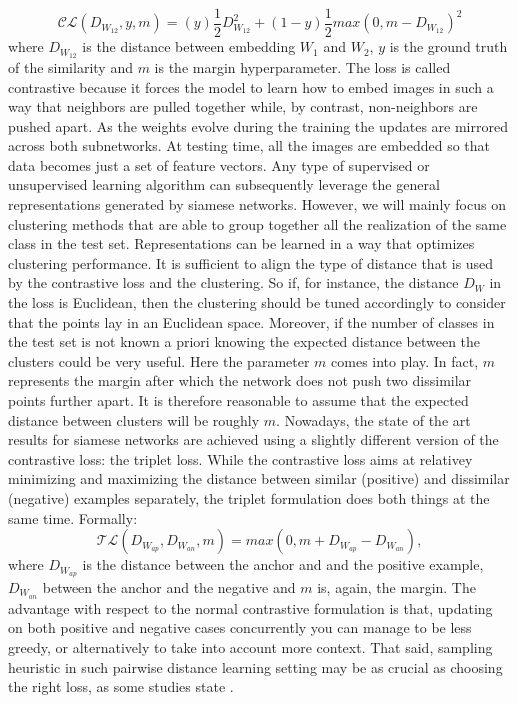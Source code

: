 \begin{equation}
  \mathcal{CL}(D_{W_{12}}, y, m) = (y)\frac{1}{2}D_{W_{12}}^2 + (1-y)\frac{1}{2}max(0,m-D_{W_{12}})^2
\end{equation}
where $D_{W_{12}}$ is the distance between embedding $W_1$ and $W_2$, $y$ is the ground truth of the similarity and $m$ is the margin hyperparameter. The loss is called contrastive because it forces the model to learn how to embed images in such a way that neighbors are pulled together while, by contrast, non-neighbors are pushed apart.
\bigbreak
\noindent As the weights evolve during the training the updates are mirrored across both subnetworks. At testing time, all the images are embedded so that data becomes just a set of feature vectors. Any type of supervised or unsupervised learning algorithm can subsequently leverage the general representations generated by siamese networks. However, we will mainly focus on clustering methods that are able to group together all the realization of the same class in the test set. Representations can be learned in a way that optimizes clustering performance. It is sufficient to align the type of distance that is used by the contrastive loss and the clustering. So if, for instance, the distance $D_W$ in the loss is Euclidean, then the clustering should be tuned accordingly to consider that the points lay in an Euclidean space. Moreover, if the number of classes in the test set is not known a priori knowing the expected distance between the clusters could be very useful. Here the parameter $m$ comes into play. In fact, $m$ represents the margin after which the network does not push two dissimilar points further apart. It is therefore reasonable to assume that the expected distance between clusters will be roughly $m$.
\bigbreak
\noindent Nowadays, the state of the art results for siamese networks are achieved using a slightly different version of the contrastive loss: the triplet loss. While the contrastive loss aims at relativey minimizing and maximizing the distance between similar (positive) and dissimilar (negative) examples separately, the triplet formulation does both things at the same time. Formally:
\begin{equation}
  \mathcal{TL}(D_{W_{ap}},D_{W_{an}}, m) = max(0,m+D_{W_{ap}}-D_{W_{an}}) ,
\end{equation}
where $D_{W_{ap}}$ is the distance between the anchor and and the positive example, $D_{W_{an}}$ between the anchor and the negative and $m$ is, again, the margin. The advantage with respect to the normal contrastive formulation is that, updating on both positive and negative cases concurrently you can manage to be less greedy, or alternatively to take into account more context. That said, sampling heuristic in such pairwise distance learning setting may be as crucial as choosing the right loss, as some studies state \cite{wu2017sampling}.

